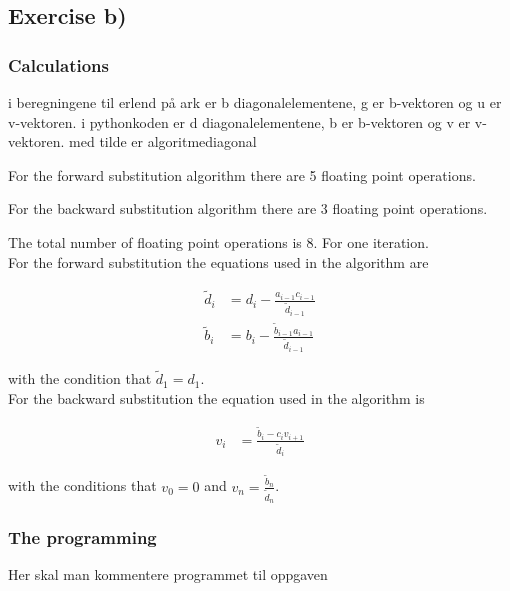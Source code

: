 \documentclass{article}
\begin{document}
\subsection{Exercise b)}

  \subsubsection{Calculations}

    i beregningene til erlend på ark er b diagonalelementene, g er b-vektoren og u er v-vektoren. i pythonkoden er d diagonalelementene, b er b-vektoren og v er v-vektoren. med tilde er algoritmediagonal

    For the forward substitution algorithm there are 5 floating point operations.

    For the backward substitution algorithm there are 3 floating point operations.

    The total number of floating point operations is 8. For one iteration. \\

    For the forward substitution the equations used in the algorithm are

    \begin{align}
      \tilde{d}_i &= d_i - \frac{a_{i-1} c_{i-1}}{\tilde{d} _{i-1}} \label{eq:3b1} \\
      \tilde{b}_i &= b_i - \frac{\tilde{b}_{i-1} a_{i-1}}{\tilde{d}_{i-1}} \label{eq:3b2}
    \end{align}

    with the condition that $\tilde{d}_1 = d_1$. \\

    For the backward substitution the equation used in the algorithm is

    \begin{align*}
      v_i &= \frac{\tilde{b}_i - c_i v_{i+1}}{\tilde{d}_i}
    \end{align*}

    with the conditions that $v_0 = 0$ and $v_n = \frac{\tilde{b}_n}{\tilde{d}_n}$.

  \subsubsection{The programming}

    Her skal man kommentere programmet til oppgaven
\end{document}
